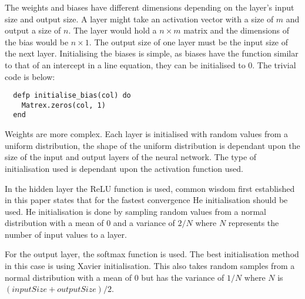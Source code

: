 The weights and biases have different dimensions depending on the layer's input
size and output size. A layer might take an activation vector with a size of
\(m\) and output a size of \(n\). The layer would hold a \(n \times m\) matrix
and the dimensions of the bias would be \(n \times 1\). The output size of one
layer must be the input size of the next layer. Initialising the biases is
simple, as biases have the function similar to that of an intercept in a line
equation, they can be initialised to 0. The trivial code is below:
\begin{lstlisting}
  defp initialise_bias(col) do
    Matrex.zeros(col, 1)
  end
\end{lstlisting} 
Weights are more complex. Each layer is initialised with random values from a
uniform distribution, the shape of the uniform distribution is dependant upon
the size of the input and output layers of the neural network. The type of
initialisation used is dependant upon the activation function used.

In the hidden layer the ReLU function is used, common wisdom first established
in this paper \cite{he2015delving} states that for the fastest convergence He
initialisation should be used. He initialisation is done by sampling random
values from a normal distribution with a mean of 0 and a variance of \( 2/N \)
where \(N\) represents the number of input values to a layer.

For the output layer, the softmax function is used. The best initialisation
method in this case is using Xavier
initialisation. \cite{glorot2010understanding} This also takes random samples
from a normal distribution with a mean of 0 but has the variance of \( 1/N \)
where \(N\) is \( (inputSize + outputSize) / 2 \).

